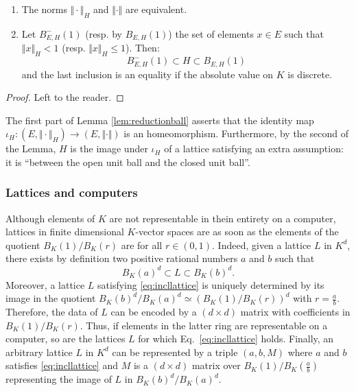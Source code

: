 \documentclass{lms}
\begin{document}
\begin{lem} \label{lem:reductionball}
\begin{enumerate}
\item The norms $\Vert \cdot \Vert_H$ and $\Vert \cdot \Vert$ are 
equivalent.
\item Let $B^-_{E,H}(1)$ (resp. by $B_{E,H}(1)$) the set of elements $x 
\in E$ such that $\Vert x \Vert_H < 1$ (resp. $\Vert x \Vert_H \leq 1$).
Then:
$$B^-_{E,H}(1) \subset H \subset B_{E,H}(1)$$
and the last inclusion is an equality if the absolute value on $K$ is
discrete.
\end{enumerate}
\end{lem}

\begin{proof}
Left to the reader.
\end{proof}

The first part of Lemma \ref{lem:reductionball} asserts that the 
identity map $\iota_H : (E, \Vert \cdot \Vert_H) \to (E, \Vert \cdot 
\Vert)$ is an homeomorphism. Furthermore, by the second of the Lemma, 
$H$ is the image under $\iota_H$ of a lattice satisfying an extra 
assumption: it is ``between the open unit ball and the closed unit 
ball''.

\subsubsection*{Lattices and computers}

Although elements of $K$ are not representable in thein entirety on a 
computer, lattices in finite dimensional $K$-vector spaces are as soon 
as the elements of the quotient $B_K(1)/B_K(r)$ are for all $r \in 
(0,1)$. Indeed, given a lattice $L$ in $K^d$, there exists by definition 
two positive rational numbers $a$ and $b$ such that 
\begin{equation}
\label{eq:incllattice}
B_K(a)^d \subset L \subset B_K(b)^d.
\end{equation}
Moreover, a lattice $L$ satisfying \eqref{eq:incllattice} is uniquely 
determined by its image in the quotient $B_K(b)^d / B_K(a)^d \simeq 
(B_K(1)/B_K(r))^d$ with $r = \frac a b$. Therefore, the data of $L$ can 
be encoded by a $(d \times d)$ matrix with coefficients in $B_K(1)/
B_K(r)$. Thus, if elements in the latter ring are representable on a 
computer, so are the lattices $L$ for which Eq.~\eqref{eq:incllattice} 
holds. Finally, an arbitrary lattice $L$ in $K^d$ can be represented
by a triple $(a,b,M)$ where $a$ and $b$ satisfies \eqref{eq:incllattice}
and $M$ is a $(d \times d)$ matrix over $B_K(1)/B_K(\frac a b)$ 
representing the image of $L$ in $B_K(b)^d / B_K(a)^d$.
\end{document}
